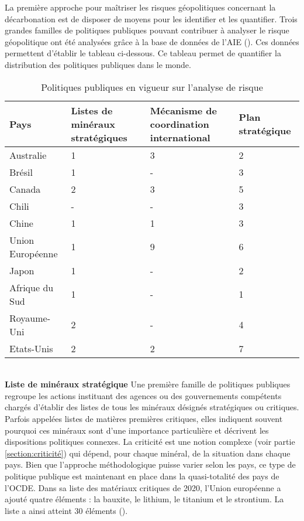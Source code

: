 La première approche pour maîtriser les risques géopolitiques concernant la décarbonation est de disposer de moyens pour les identifier et les quantifier. Trois grandes familles de politiques publiques pouvant contribuer à analyser le risque géopolitique ont été analysées grâce à la base de données de l'AIE (\cite{iea_critical_2022}). Ces données permettent d'établir le tableau ci-dessous. Ce tableau permet de quantifier la distribution des politiques publiques dans le monde.
\begin{table}[!h]
\centering
\begin{tabular}{ |p{3cm}||p{3.5cm}|p{3.5cm}|p{3.5cm}|  }
 \hline
 Pays & Listes de minéraux stratégiques & Mécanisme de coordination international & Plan stratégique\\
 \hline
 Australie          & 1     & 3     & 2 \\
 Brésil             & 1     & -     & 3 \\
 Canada             & 2     & 3     & 5 \\
 Chili              & -     & -     & 3 \\
 Chine              & 1     & 1     & 3 \\
 Union Européenne   & 1     & 9     & 6 \\
 Japon              & 1     & -     & 2 \\
 Afrique du Sud     & 1     & -     & 1 \\
 Royaume-Uni        & 2     & -     & 4 \\
 Etats-Unis         & 2     & 2     & 7 \\
 \hline
\end{tabular}
    \caption{Politiques publiques en vigueur sur l'analyse de risque}
    \label{tab:analyse}
\end{table}
~\\
\textbf{Liste de minéraux stratégique}\smallbreak
Une première famille de politiques publiques regroupe les actions instituant des agences ou des gouvernements compétents chargés d'établir des listes de tous les minéraux désignés stratégiques ou critiques. Parfois appelées listes de matières premières critiques, elles indiquent souvent pourquoi ces minéraux sont d'une importance particulière et décrivent les dispositions politiques connexes.\smallbreak
La criticité est une notion complexe (voir
partie \ref{section:criticité}) qui dépend, pour chaque minéral, de la situation dans chaque pays. Bien que l'approche méthodologique puisse varier selon les pays, ce type de politique publique est maintenant en place dans la quasi-totalité des pays de l'OCDE. Dans sa liste des matériaux critiques de 2020, l'Union européenne a ajouté quatre éléments : la bauxite, le lithium, le titanium et le strontium. La liste a ainsi atteint 30 éléments (\cite{european_commission_critical_2020}).\smallbreak
